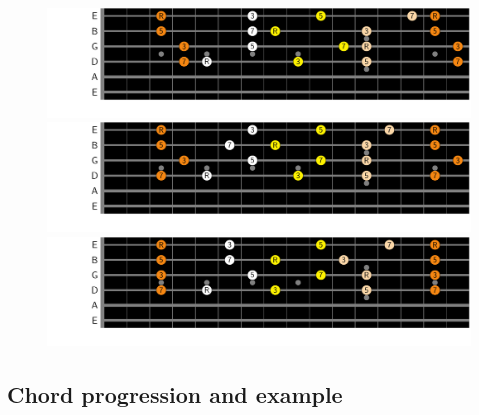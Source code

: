\documentclass{article}
\begin{document}
\begin{figure}[h!]
	\centering
	\hspace*{-2.2cm}
	\includegraphics[scale=0.7, trim= {0cm 0cm 0cm 0cm}, clip]{figures/chord-inversions/maj7.pdf}
	\hspace*{-2.2cm}
	\includegraphics[scale=0.7, trim= {0cm 0cm 0cm 0cm}, clip]{figures/chord-inversions/Dominant7.pdf}
	\hspace*{-2.2cm}
	\includegraphics[scale=0.7, trim= {0cm 0cm 0cm 0cm}, clip]{figures/chord-inversions/m7.pdf}
	\caption{ }
	\label{fig}
\end{figure}



\newpage
\subsection{Chord progression and example}
\end{document}
